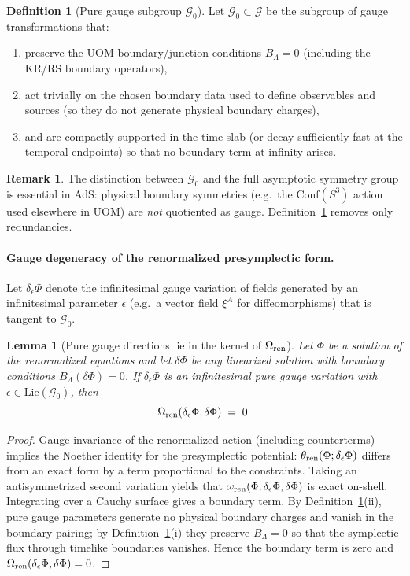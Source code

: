 \documentclass[10pt]{article}
\theoremstyle{definition}
\newtheorem{definition}{Definition}[section]
\newtheorem{remark}{Remark}[section]
\theoremstyle{plain}
\newtheorem{lemma}{Lemma}[section]
\begin{document}
\begin{definition}[Pure gauge subgroup $\mathcal G_0$]
\label{def:G0}
Let $\mathcal G_0\subset\mathcal G$ be the subgroup of gauge transformations that:
\begin{enumerate}[label=(\roman*),leftmargin=2.0em,itemsep=1pt]
\item preserve the UOM boundary/junction conditions $B_\Lambda=0$ (including the KR/RS boundary operators),
\item act trivially on the chosen boundary data used to define observables and sources (so they do not generate physical boundary charges),
\item and are compactly supported in the time slab (or decay sufficiently fast at the temporal endpoints) so that no boundary term at infinity arises.
\end{enumerate}
\end{definition}

\begin{remark}
The distinction between $\mathcal G_0$ and the full asymptotic symmetry group is essential in AdS: physical boundary symmetries (e.g.\ the
$\mathrm{Conf}(S^3)$ action used elsewhere in UOM) are \emph{not} quotiented as gauge.  Definition~\ref{def:G0} removes only redundancies.
\end{remark}

\paragraph{Gauge degeneracy of the renormalized presymplectic form.}
Let $\delta_\epsilon\Phi$ denote the infinitesimal gauge variation of fields generated by an infinitesimal parameter $\epsilon$ (e.g.\ a vector field
$\xi^A$ for diffeomorphisms) that is tangent to $\mathcal G_0$.

\begin{lemma}[Pure gauge directions lie in the kernel of $\Omega_{\rm ren}$]
\label{lem:gauge-kernel}
Let $\Phi$ be a solution of the renormalized equations and let $\delta\Phi$ be any linearized solution with boundary conditions $B_\Lambda(\delta\Phi)=0$.
If $\delta_\epsilon\Phi$ is an infinitesimal pure gauge variation with $\epsilon\in \mathrm{Lie}(\mathcal G_0)$, then
\[
\Omega_{\rm ren}(\delta_\epsilon\Phi,\delta\Phi)\;=\;0.
\]
\end{lemma}

\begin{proof}
Gauge invariance of the renormalized action (including counterterms) implies the Noether identity for the presymplectic potential:
$\theta_{\rm ren}(\Phi;\delta_\epsilon\Phi)$ differs from an exact form by a term proportional to the constraints.
Taking an antisymmetrized second variation yields that $\omega_{\rm ren}(\Phi;\delta_\epsilon\Phi,\delta\Phi)$ is exact on-shell.
Integrating over a Cauchy surface gives a boundary term.  By Definition~\ref{def:G0}(ii), pure gauge parameters generate no physical
boundary charges and vanish in the boundary pairing; by Definition~\ref{def:G0}(i) they preserve $B_\Lambda=0$ so that the symplectic flux
through timelike boundaries vanishes. Hence the boundary term is zero and $\Omega_{\rm ren}(\delta_\epsilon\Phi,\delta\Phi)=0$.
\end{proof}
\end{document}
